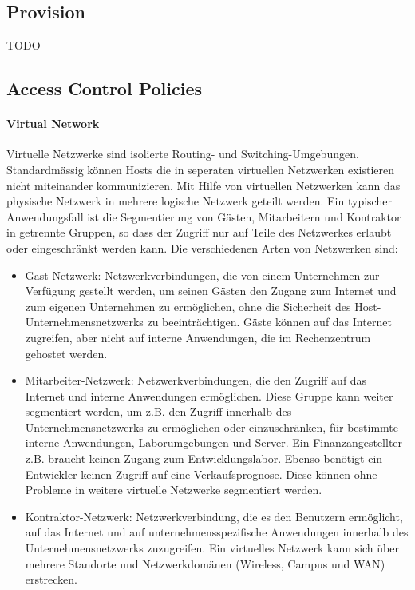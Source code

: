 \subsection{Provision}
TODO

\subsection{Access Control Policies}

\paragraph{Virtual Network}
Virtuelle Netzwerke sind isolierte Routing- und Switching-Umgebungen. Standardmässig können Hosts die in seperaten virtuellen Netzwerken existieren nicht miteinander kommunizieren. Mit Hilfe von virtuellen Netzwerken kann das physische Netzwerk in mehrere logische Netzwerk geteilt werden. Ein typischer Anwendungsfall ist die Segmentierung von Gästen, Mitarbeitern und Kontraktor in getrennte Gruppen, so dass der Zugriff nur auf Teile des Netzwerkes erlaubt oder eingeschränkt werden kann. Die verschiedenen Arten von Netzwerken sind:

\begin{itemize}
	\item Gast-Netzwerk: Netzwerkverbindungen, die von einem Unternehmen zur Verfügung gestellt werden, um seinen Gästen den Zugang zum Internet und zum eigenen Unternehmen zu ermöglichen, ohne die Sicherheit des Host-Unternehmensnetzwerks zu beeinträchtigen. Gäste können auf das Internet zugreifen, aber nicht auf interne Anwendungen, die im Rechenzentrum gehostet werden.
	\item Mitarbeiter-Netzwerk: Netzwerkverbindungen, die den Zugriff auf das Internet und interne Anwendungen ermöglichen. Diese Gruppe kann weiter segmentiert werden, um z.B. den Zugriff innerhalb des Unternehmensnetzwerks zu ermöglichen oder einzuschränken, für bestimmte interne Anwendungen, Laborumgebungen und Server. Ein Finanzangestellter z.B. braucht keinen Zugang zum Entwicklungslabor. Ebenso benötigt ein Entwickler keinen Zugriff auf eine Verkaufsprognose. Diese können ohne Probleme in weitere virtuelle Netzwerke segmentiert werden.
	\item Kontraktor-Netzwerk: Netzwerkverbindung, die es den Benutzern ermöglicht, auf das Internet und auf unternehmensspezifische Anwendungen innerhalb des Unternehmensnetzwerks zuzugreifen. Ein virtuelles Netzwerk kann sich über mehrere Standorte und Netzwerkdomänen (Wireless, Campus und WAN) erstrecken.
\end{itemize}


